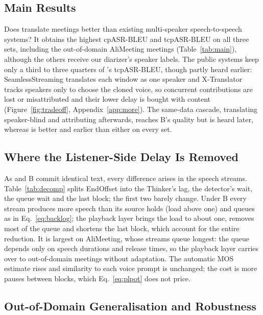 

\subsection{Main Results}
\label{sec:res-sys}

Does \sys{} translate meetings better than existing multi-speaker speech-to-speech systems? It obtains the highest
cpASR-BLEU and tcpASR-BLEU on all three sets, including the out-of-domain AliMeeting meetings (Table~\ref{tab:main}),
although the others receive our diarizer's speaker labels. The public
systems keep only a third to three quarters of \sys{}'s tcpASR-BLEU, though partly heard earlier: SeamlessStreaming translates each window as one speaker and
X-Translator tracks speakers only to choose the cloned voice, so concurrent contributions are lost or misattributed and
their lower delay is bought with content (Figure~\ref{fig:tradeoff}, Appendix~\ref{app:more}). The same-data cascade,
translating speaker-blind and attributing afterwards, reaches B's quality but is heard later, whereas \sys{} is better
and earlier than either on every set.



\subsection{Where the Listener-Side Delay Is Removed}
\label{sec:res-delay}

As \sys{} and B commit identical text, every difference arises in the speech streams. Table~\ref{tab:decomp} splits
EndOffset into the Thinker's lag, the detector's wait, the queue wait and the last block; the first two barely change.
Under B every stream produces more speech than its source holds (load above one) and queues as in
Eq.~\eqref{eq:backlog}; the playback layer brings the load to about one, removes most of the queue and shortens the
last block, which account for the entire reduction. It is largest on AliMeeting, whose streams queue longest: the queue
depends only on speech durations and release times, so the playback layer carries over to out-of-domain meetings
without adaptation. The automatic MOS estimate rises and similarity to each voice prompt is unchanged; the cost is
more pauses between blocks, which Eq.~\eqref{eq:plpot} does not price.



\subsection{Out-of-Domain Generalisation and Robustness}
\label{sec:res-robust}


